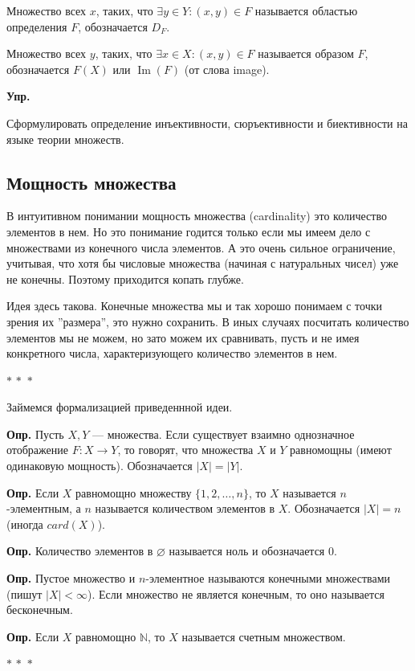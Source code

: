 \documentclass[a4paper,12pt]{article}
\newcommand{\threestars}{\begin{center}$ {\ast}\,{\ast}\,{\ast} $\end{center}}
\DeclareMathOperator{\Ima}{Im}
\newcounter{th-counter}
\newcounter{df-counter}
\newcounter{col-counter}
\newcommand{\df}{\par\noindent\textbf{Опр.} }
\newenvironment{exercise}{%
  \par\noindent\color{blue!70!black}\textbf{Упр.}%
}{\par}
\begin{document}
Множество всех $x$, таких, что $\exists y \in Y: (x,y) \in F$ называется областью определения $F$, обозначается $D_F$.

Множество всех $y$, таких, что $\exists x \in X : (x, y) \in F$ называется образом $F$, обозначается $F(X)$ или $\Ima (F)$ (от слова image).

\begin{exercise}
    Сформулировать определение инъективности, сюръективности и биективности на языке теории множеств.
\end{exercise}

\subsection*{Мощность множества}
В интуитивном понимании мощность множества (cardinality) это количество элементов в нем. Но это понимание годится только если мы имеем дело с множествами из конечного числа элементов. А это очень сильное ограничение, учитывая, что хотя бы числовые множества (начиная с натуральных чисел) уже не конечны. Поэтому приходится копать глубже.

Идея здесь такова. Конечные множества мы и так хорошо понимаем с точки зрения их ''размера'', это нужно сохранить. В иных случаях посчитать количество элементов мы не можем, но зато можем их сравнивать, пусть и не имея конкретного числа, характеризующего количество элементов в нем.

\threestars
Займемся формализацией приведеннной идеи.

\df Пусть $X, Y$ --- множества. Если существует взаимно однозначное отображение $F: X \rightarrow Y$, то говорят, что множества $X$ и $Y$ равномощны (имеют одинаковую мощность). Обозначается $|X| = |Y|$.

\df Если $X$ равномощно множеству $\{1, 2, \ldots, n\}$, то $X$ называется $n$-элементным, а $n$ называется количеством элементов в $X$. Обозначается $|X| = n$  (иногда $card(X)$).

\df Количество элементов в $\varnothing$ называется ноль и обозначается $0$.

\df Пустое множество и $n$-элементное называются конечными множествами (пишут $|X| < \infty$). Если множество не является конечным, то оно называется бесконечным.

\df Если $X$ равномощно $\mathbb{N}$, то $X$ называется счетным множеством.

\threestars
\end{document}
